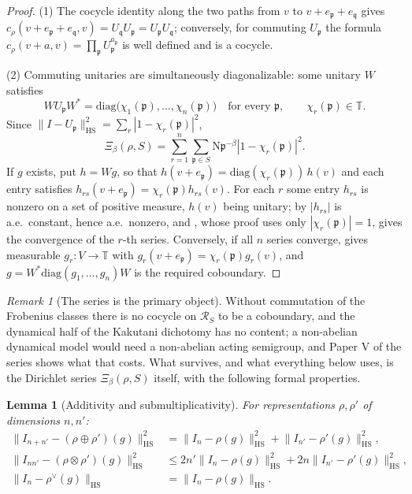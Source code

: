 \documentclass[11pt]{amsart}
\numberwithin{equation}{section}
\newtheorem{lemma}[theorem]{Lemma}
\theoremstyle{definition}
\theoremstyle{remark}
\newtheorem{remark}[theorem]{Remark}
\newcommand{\T}{\mathbb{T}}
\newcommand{\cR}{\mathcal{R}}
\newcommand{\pp}{\mathfrak{p}}
\newcommand{\qq}{\mathfrak{q}}
\newcommand{\Ns}{\mathrm{N}}
\newcommand{\HS}{\mathrm{HS}}
\begin{document}
\begin{proof}
(1) The cocycle identity along the two paths from $v$ to $v+e_\pp+e_\qq$ gives
$c_\rho(v+e_\pp+e_\qq,v)=U_\qq U_\pp=U_\pp U_\qq$; conversely, for commuting $U_\pp$ the
formula $c_\rho(v+a,v)=\prod_\pp U_\pp^{a_\pp}$ is well defined and is a cocycle.

(2) Commuting unitaries are simultaneously diagonalizable: some unitary $W$ satisfies
\[
WU_\pp W^*=\mathrm{diag}\bigl(\chi_1(\pp),\dots,\chi_n(\pp)\bigr)\quad\text{for every }\pp,
\qquad\chi_r(\pp)\in\T .
\] Since $\|I-U_\pp\|_{\HS}^2=\sum_r|1-\chi_r(\pp)|^2$,
\[
\Xi_\beta(\rho,S)=\sum_{r=1}^n\sum_{\pp\in S}\Ns\pp^{-\beta}|1-\chi_r(\pp)|^2 .
\]
If $g$ exists, put $h=Wg$, so that $h(v+e_\pp)=\mathrm{diag}(\chi_r(\pp))\,h(v)$ and each
entry satisfies $h_{rs}(v+e_\pp)=\chi_r(\pp)h_{rs}(v)$. For each $r$ some entry $h_{rs}$ is
nonzero on a set of positive measure, $h(v)$ being unitary; by \cite[Lem.~3.1]{Main}
$|h_{rs}|$ is a.e.\ constant, hence a.e.\ nonzero, and \cite[Prop.~3.3]{Main}, whose proof
uses only $|\chi_r(\pp)|=1$, gives the convergence of the $r$-th series. Conversely,
if all $n$ series converge, \cite[Prop.~3.4]{Main} gives measurable $g_r:V\to\T$ with
$g_r(v+e_\pp)=\chi_r(\pp)g_r(v)$, and $g=W^*\mathrm{diag}(g_1,\dots,g_n)W$ is the required
coboundary.
\end{proof}

\begin{remark}[The series is the primary object]\label{rem:primary}
Without commutation of the Frobenius classes there is no cocycle on $\cR_S$ to be a
coboundary, and the dynamical half of the Kakutani dichotomy has no content; a
non-abelian dynamical model would need a non-abelian acting semigroup, and Paper V of the
series shows what that costs. What survives, and what everything below uses, is the
Dirichlet series $\Xi_\beta(\rho,S)$ itself, with the following formal properties.
\end{remark}

\begin{lemma}[Additivity and submultiplicativity]\label{lem:additivity}
For representations $\rho,\rho'$ of dimensions $n,n'$:
\begin{align}
\bigl\|I_{n+n'}-(\rho\oplus\rho')(g)\bigr\|_{\HS}^2&=\bigl\|I_n-\rho(g)\bigr\|_{\HS}^2+\bigl\|I_{n'}-\rho'(g)\bigr\|_{\HS}^2, \label{eq:oplus}\\
\bigl\|I_{nn'}-(\rho\otimes\rho')(g)\bigr\|_{\HS}^2&\le2n'\bigl\|I_n-\rho(g)\bigr\|_{\HS}^2+2n\bigl\|I_{n'}-\rho'(g)\bigr\|_{\HS}^2, \label{eq:otimes}\\
\bigl\|I_n-\rho^\vee(g)\bigr\|_{\HS}&=\bigl\|I_n-\rho(g)\bigr\|_{\HS}. \label{eq:dual}
\end{align}
\end{lemma}
\end{document}
